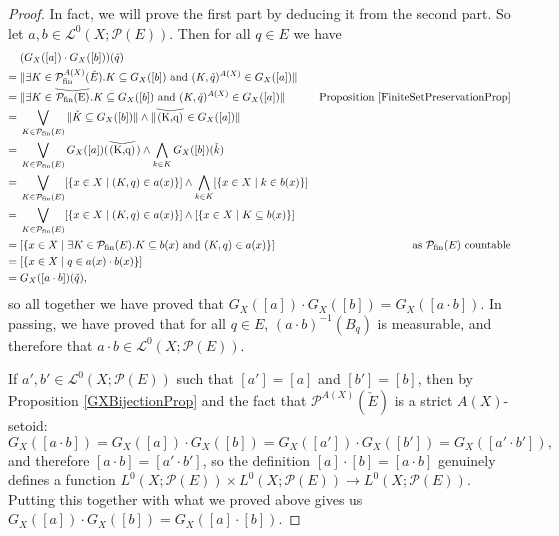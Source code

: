 \documentclass{lmcs}
\newcommand{\pfin}{\ensuremath{\powerset_{\mathrm{fin}}}}
\newcommand{\Ell}{\mathcal{L}}
\newcommand{\powerset}{\ensuremath{\mathcal{P}}}
\newcommand{\axpowerset}{\powerset^{A(X)}}
\newcommand{\axpfin}{\axpowerset_{\mathrm{fin}}}
\newcommand{\verywidecheck}[1]{
	\savestack{\tmpbox}{\stretchto{
			\scaleto{
				\scalerel*[\widthof{\ensuremath{#1}}]{\kern-.6pt\bigvee\kern-.6pt}
				{\rule[-\textheight/2]{1ex}{\textheight}}
			}{\textheight}
		}{0.5ex}}
	\stackon[1pt]{#1}{\tmpbox}
}
\begin{document}
\begin{proof}
In fact, we will prove the first part by deducing it from the second part. So let $a,b \in \Ell^0(X;\powerset(E))$. Then for all $q \in E$ we have
\begin{align*}
& (G_X([a]) \cdot G_X([b]))(\check{q}) \\
={} & \| \exists K \in \axpfin(\check{E}) . K \subseteq G_X([b]) \text{ and } (K,\check{q})^{A(X)} \in G_X([a]) \| \\
={} & \| \exists K \in \verywidecheck{\pfin(E)} . K \subseteq G_X([b]) \text{ and } (K,\check{q})^{A(X)} \in G_X([a]) \| & \text{Proposition \ref{FiniteSetPreservationProp}} \\
={} & \bigvee_{K \in \pfin(E)} \| \check{K} \subseteq G_X([b]) \| \land \| \verywidecheck{(K,q)} \in G_X([a]) \| \\
={} & \bigvee_{K \in \pfin(E)} G_X([a])(\verywidecheck{(K,q)}) \land \bigwedge_{k \in K} G_X([b])(\check{k}) \\
={} & \bigvee_{K \in \pfin(E)} [\{ x \in X \mid (K,q) \in a(x) \}] \land \bigwedge_{k \in K} [\{ x \in X \mid k \in b(x) \}] \\
={} & \bigvee_{K \in \pfin(E)} [\{ x \in X \mid (K,q) \in a(x) \}] \land [\{ x \in X \mid K \subseteq b(x) \}] \\
={} & [\{x \in X \mid \exists K \in \pfin(E) . K \subseteq b(x) \text{ and } (K,q) \in a(x)\}] & \text{as $\pfin(E)$ countable} \\
={} & [\{x \in X \mid q \in a(x) \cdot b(x)\}] \\
={} & G_X([a \cdot b])(\check{q}),
\end{align*}
so all together we have proved that $G_X([a]) \cdot G_X([b]) = G_X([a \cdot b])$. In passing, we have proved that for all $q \in E$, $(a \cdot b)^{-1}(B_q)$ is measurable, and therefore that $a \cdot b \in \Ell^0(X;\powerset(E))$.
	
If $a',b' \in \Ell^0(X;\powerset(E))$ such that $[a'] = [a]$ and $[b'] = [b]$, then by Proposition \ref{GXBijectionProp} and the fact that $\axpowerset(\check{E})$ is a strict $A(X)$-setoid:
\[
G_X([a \cdot b]) = G_X([a]) \cdot G_X([b]) = G_X([a']) \cdot G_X([b']) = G_X([a' \cdot b']),
\]
and therefore $[a \cdot b] = [a' \cdot b']$, so the definition $[a] \cdot [b] = [a \cdot b]$ genuinely defines a function $L^0(X;\powerset(E)) \times L^0(X; \powerset(E)) \rightarrow L^0(X;\powerset(E))$. Putting this together with what we proved above gives us $G_X([a]) \cdot G_X([b]) = G_X([a] \cdot [b])$. 
\end{proof}
\end{document}
